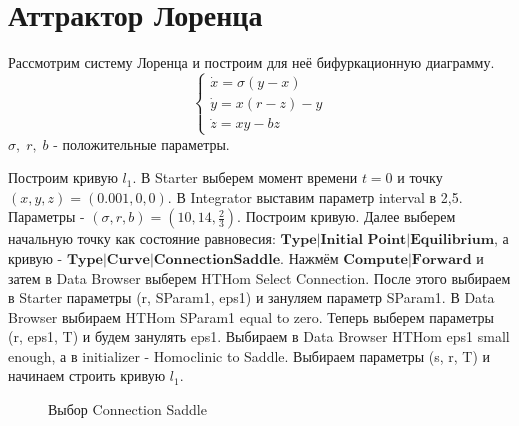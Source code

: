 \documentclass[12pt, a4paper]{article}
\begin{document}
\section{Аттрактор Лоренца}
Рассмотрим систему Лоренца и построим для неё бифуркационную диаграмму.
\begin{equation*}
	\begin{cases}
		\dot x = \sigma (y - x) \\
		\dot y = x(r - z) - y \\
		\dot z = xy - bz
	\end{cases}
\end{equation*}
$\sigma, \; r, \; b$ - положительные параметры.

Построим кривую $l_1$.
\newline
В Starter выберем момент времени $t=0$ и точку $(x,y,z) = (0.001, 0, 0)$. В Integrator выставим параметр interval в 2,5. Параметры - $(\sigma, r, b) = (10, 14, \frac{2}{3})$. Построим кривую. Далее выберем начальную точку как состояние равновесия: $\textbf{Type|Initial Point|Equilibrium}$, а кривую - $\textbf{Type|Curve|ConnectionSaddle}$. Нажмём $\textbf{Compute|Forward}$ и затем в Data Browser выберем HTHom Select Connection. После этого выбираем в Starter параметры (r, SParam1, eps1) и зануляем параметр SParam1. В Data Browser выбираем HTHom SParam1 equal to zero. Теперь выберем параметры (r, eps1, T) и будем занулять eps1. Выбираем в Data Browser HTHom eps1 small enough, а в initializer - Homoclinic to Saddle. Выбираем параметры (s, r, T) и начинаем строить кривую $l_1$.
\begin{figure}[H]
	\caption{Выбор Connection Saddle}
\end{figure}
\end{document}
